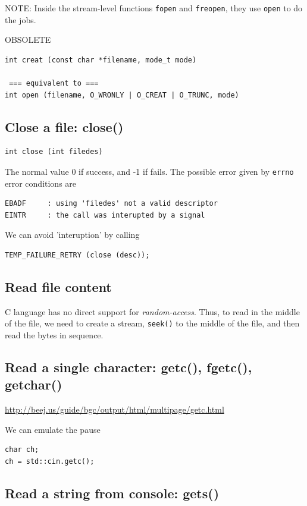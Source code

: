 NOTE: Inside the stream-level functions \verb!fopen! and \verb!freopen!, they
use \verb!open! to do the jobs. 

OBSOLETE 
\begin{verbatim}
int creat (const char *filename, mode_t mode)

 === equivalent to ===
int open (filename, O_WRONLY | O_CREAT | O_TRUNC, mode)
\end{verbatim}

\subsection{Close a file: close()}

\begin{verbatim}
int close (int filedes)
\end{verbatim}
The normal value 0 if success, and -1 if fails. The possible error given by
\verb!errno! error conditions are
\begin{verbatim}
EBADF     : using 'filedes' not a valid descriptor
EINTR     : the call was interupted by a signal
\end{verbatim}

We can avoid 'interuption' by calling
\begin{verbatim}
TEMP_FAILURE_RETRY (close (desc));
\end{verbatim}

\subsection{Read file content}

C language has no direct support for {\it random-access}. Thus, to read in the
middle of the file, we need to create a stream, \verb!seek()! to the middle of
the file, and then read the bytes in sequence.

\subsection{Read a single character: getc(), fgetc(), getchar()}

\url{http://beej.us/guide/bgc/output/html/multipage/getc.html}

We can emulate the pause
\begin{verbatim}
char ch;
ch = std::cin.getc();
\end{verbatim}

\subsection{Read a string from console: gets()}

